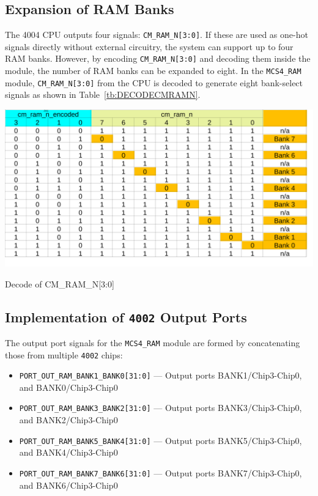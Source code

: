 \subsection{Expansion of RAM Banks}
The 4004 CPU outputs four signals: \verb|CM_RAM_N[3:0]|.  
If these are used as one-hot signals directly without external circuitry, the system can support up to four RAM banks. However, by encoding \verb|CM_RAM_N[3:0]| and decoding them inside the module, the number of RAM banks can be expanded to eight. 
In the \texttt{MCS4\_RAM} module, \verb|CM_RAM_N[3:0]| from the CPU is decoded to generate eight bank-select signals as shown in Table~\ref{tb:DECODECMRAMN}.

\begin{table}[htbp]
    \includegraphics[width=1.00\columnwidth]{./Table/DecodeCMRAM.png}
    \caption{Decode of CM\_RAM\_N[3:0]}
    \label{tb:DECODECMRAMN}
\end{table}

\subsection{\textbf{Implementation of \texttt{4002} Output Ports}}
The output port signals for the \texttt{MCS4\_RAM} module are formed by concatenating those from multiple \texttt{4002} chips:

\begin{itemize}
  \item \verb|PORT_OUT_RAM_BANK1_BANK0[31:0]| — Output ports BANK1/Chip3-Chip0, and  BANK0/Chip3-Chip0
  \item \verb|PORT_OUT_RAM_BANK3_BANK2[31:0]| — Output ports BANK3/Chip3-Chip0, and  BANK2/Chip3-Chip0
  \item \verb|PORT_OUT_RAM_BANK5_BANK4[31:0]| — Output ports BANK5/Chip3-Chip0, and  BANK4/Chip3-Chip0
  \item \verb|PORT_OUT_RAM_BANK7_BANK6[31:0]| — Output ports BANK7/Chip3-Chip0, and  BANK6/Chip3-Chip0
\end{itemize}

